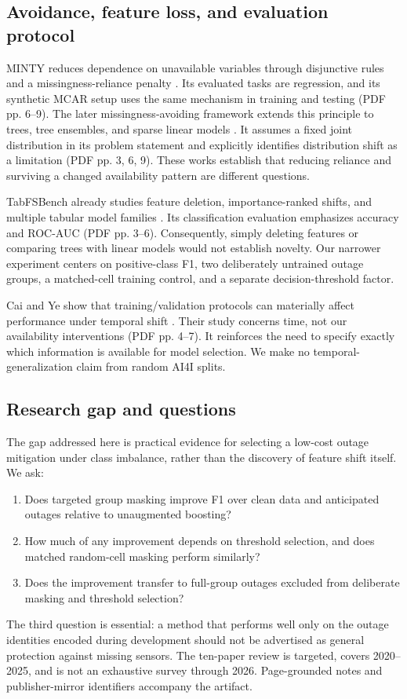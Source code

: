 \documentclass[conference]{IEEEtran}
\begin{document}
\subsection{Avoidance, feature loss, and evaluation protocol}
MINTY reduces dependence on unavailable variables through disjunctive rules and a missingness-reliance penalty \cite{stempfle24a}. Its evaluated tasks are regression, and its synthetic MCAR setup uses the same mechanism in training and testing (PDF pp. 6--9). The later missingness-avoiding framework extends this principle to trees, tree ensembles, and sparse linear models \cite{stempfle25a}. It assumes a fixed joint distribution in its problem statement and explicitly identifies distribution shift as a limitation (PDF pp. 3, 6, 9). These works establish that reducing reliance and surviving a changed availability pattern are different questions.

TabFSBench already studies feature deletion, importance-ranked shifts, and multiple tabular model families \cite{cheng25e}. Its classification evaluation emphasizes accuracy and ROC-AUC (PDF pp. 3--6). Consequently, simply deleting features or comparing trees with linear models would not establish novelty. Our narrower experiment centers on positive-class F1, two deliberately untrained outage groups, a matched-cell training control, and a separate decision-threshold factor.

Cai and Ye show that training/validation protocols can materially affect performance under temporal shift \cite{cai25j}. Their study concerns time, not our availability interventions (PDF pp. 4--7). It reinforces the need to specify exactly which information is available for model selection. We make no temporal-generalization claim from random AI4I splits.

\subsection{Research gap and questions}
The gap addressed here is practical evidence for selecting a low-cost outage mitigation under class imbalance, rather than the discovery of feature shift itself. We ask:
\begin{enumerate}
\item Does targeted group masking improve F1 over clean data and anticipated outages relative to unaugmented boosting?
\item How much of any improvement depends on threshold selection, and does matched random-cell masking perform similarly?
\item Does the improvement transfer to full-group outages excluded from deliberate masking and threshold selection?
\end{enumerate}
The third question is essential: a method that performs well only on the outage identities encoded during development should not be advertised as general protection against missing sensors. The ten-paper review is targeted, covers 2020--2025, and is not an exhaustive survey through 2026. Page-grounded notes and publisher-mirror identifiers accompany the artifact.
\end{document}
